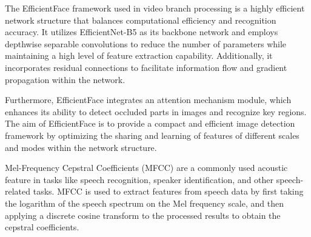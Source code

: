 The EfficientFace framework used in video branch processing is a highly efficient network structure that balances computational efficiency and recognition accuracy. It utilizes EfficientNet-B5 as its backbone network and employs depthwise separable convolutions to reduce the number of parameters while maintaining a high level of feature extraction capability. Additionally, it incorporates residual connections to facilitate information flow and gradient propagation within the network.

Furthermore, EfficientFace integrates an attention mechanism module, which enhances its ability to detect occluded parts in images and recognize key regions. The aim of EfficientFace is to provide a compact and efficient image detection framework by optimizing the sharing and learning of features of different scales and modes within the network structure\cite{Wang2023EfficientFace}.

Mel-Frequency Cepstral Coefficients (MFCC) are a commonly used acoustic feature in tasks like speech recognition, speaker identification, and other speech-related tasks. MFCC is used to extract features from speech data by first taking the logarithm of the speech spectrum on the Mel frequency scale, and then applying a discrete cosine transform to the processed results to obtain the cepstral coefficients\cite{MFCC}.




